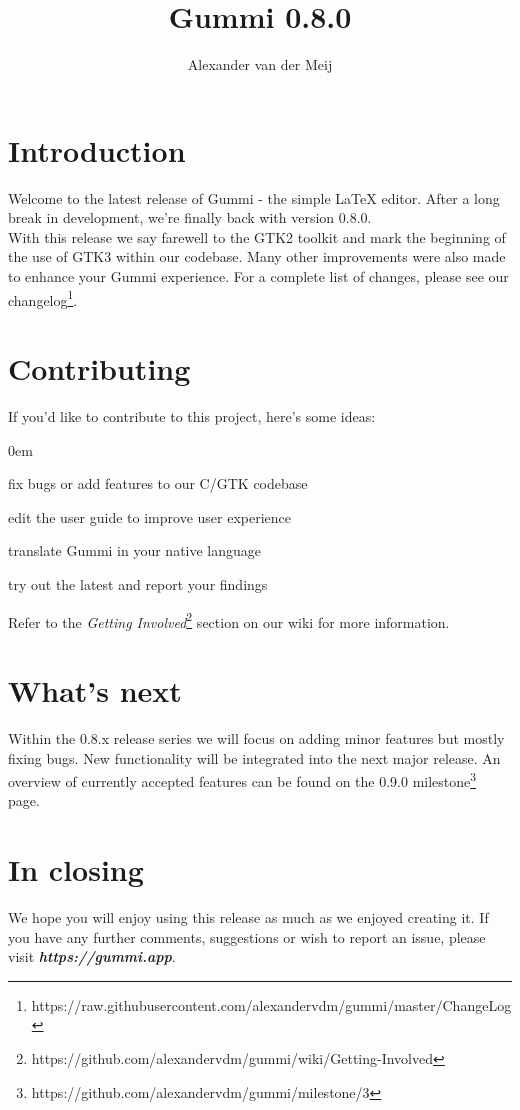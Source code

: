 \documentclass[11pt]{article}
\title{\textbf{Gummi 0.8.0}}
\author{Alexander van der Meij}
\date{}
\begin{document}
\maketitle
\thispagestyle{empty}

\section{Introduction}
Welcome to the latest release of Gummi - the simple {\LaTeX} editor. After a long break in development, we're finally back with version 0.8.0.\\
With this release we say farewell to the GTK2 toolkit and mark the beginning of the use of GTK3 within our codebase. Many other improvements were also made to enhance your Gummi experience. For a complete list of changes, please see our changelog\footnote{https://raw.githubusercontent.com/alexandervdm/gummi/master/ChangeLog}. 

\section{Contributing}
If you'd like to contribute to this project, here's some ideas:
\begin{description}
\addtolength{\itemindent}{0.80cm}
\itemsep0em 
\item[Development] fix bugs or add features to our C/GTK codebase
\item[Documentation] edit the user guide to improve user experience
\item[Localization] translate Gummi in your native language
\item[Testing] try out the latest and report your findings
\end{description}
Refer to the \emph{Getting Involved}\footnote{https://github.com/alexandervdm/gummi/wiki/Getting-Involved} section on our wiki for more information. 

\section{What's next}
Within the 0.8.x release series we will focus on adding minor features but mostly fixing bugs. New functionality will be integrated into the next major release. An overview of currently accepted features can be found on the 0.9.0 milestone\footnote{https://github.com/alexandervdm/gummi/milestone/3} page.

\section{In closing}
We hope you will enjoy using this release as much as we enjoyed creating it. If you have any further comments, suggestions or wish to report an issue, please visit \emph{\textbf{https://gummi.app}}. 
\end{document}
